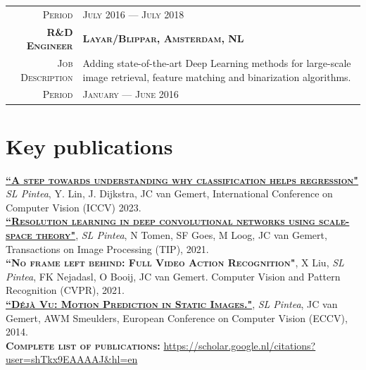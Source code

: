 \documentclass[a4paper, oneside, final]{scrartcl}
\newcommand{\gray}{\rowcolor[gray]{.90}}
\begin{document}
\begin{center}
\begin{tabular}{r@{\hskip 0.3in}p{12.3cm}}
			\textsc{Period}                     & \textsc{July 2016 --- July 2018} 
            \vspace{5px}\\
			\gray \textsc{\textbf{R\&D Engineer}}   & \textsc{\textbf{Layar\slash Blippar, Amsterdam, NL}}\\
			\textsc{Job Description}                &  Adding state-of-the-art Deep Learning methods for large-scale image retrieval, 
				feature matching and binarization algorithms.\\
			\textsc{Period}                         & \textsc{January --- June 2016} 
		\end{tabular}

		\section{Key publications}
        \begin{flushleft}
            \textsc{\textbf{\href{https://github.com/SilviaLauraPintea/reg-cls}{``A step towards understanding why classification helps regression"}}} \emph{SL Pintea}, Y. Lin, J. Dijkstra, JC van Gemert, International Conference on Computer Vision (ICCV) 2023.\\[3px]

            \textsc{\textbf{\href{https://github.com/SilviaLauraPintea/N-JetNet}{``Resolution learning in deep convolutional networks using scale-space theory"}}}, \emph{SL Pintea}, N Tomen, SF Goes, M Loog, JC van Gemert, Transactions on Image Processing (TIP), 2021.\\[3px]
			\textsc{\textbf{``No frame left behind: Full Video Action Recognition"}}, X Liu, \emph{SL Pintea}, FK Nejadasl, O Booij, JC van Gemert. 
            Computer Vision and Pattern Recognition (CVPR), 2021.\\[3px]
            \textsc{\textbf{\href{http://github.com/SilviaLauraPintea/DejaVu}{``D\'{e}j\`{a} Vu: Motion Prediction in Static Images."}}}, \emph{SL Pintea}, JC van Gemert, AWM Smeulders, 
            European Conference on Computer Vision (ECCV), 2014.\\[10px]
            \textsc{\textbf{Complete list of publications:}} \href{https://scholar.google.nl/citations?user=shTkx9EAAAAJ&hl=en}{https://scholar.google.nl/citations?user=shTkx9EAAAAJ\&hl=en}\\
        \end{flushleft}

\end{center}
\end{document}
